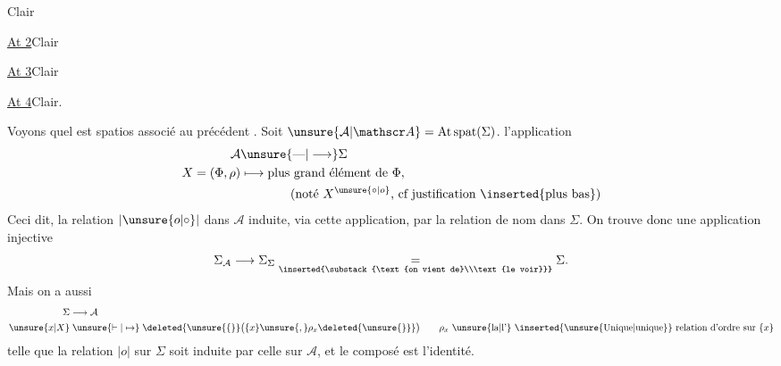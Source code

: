 \quad Clair

\uline{At 2}\quad Clair 

\uline{At 3}\quad Clair

\uline{At 4}\quad Clair.

 Voyons quel est    spatios associé au précédent .  Soit $\unsure{\mathcal A|\mathscr A}=\mathrm{At}\,\mathrm{spat}(\Sigma)$.  \deleted{$(\unsure{\Phi|\varPhi},\rho)$} l'application
\[
\begin{aligned}
\mathcal A&\unsure{\text{\textemdash}|\longrightarrow}\Sigma\\
X=(\Phi,\rho)&\longmapsto\text{plus grand élément de }\Phi,\\
&\hspace{4em}\text{(noté }X^{\unsure{\circ|o}}\text{, cf justification \inserted{plus bas})}
\end{aligned}
\]
Ceci dit, la relation $\mathrel{|\unsure{o|\circ}|}$ dans $\mathcal A$  induite, via cette application, par la relation de  nom dans $\Sigma$. On trouve donc une application injective
\[
\Sigma_{\mathcal A}\longrightarrow\Sigma_{\Sigma}
\underset{\inserted{\substack{\text{on vient de}\\\text{le voir}}}}{=}\Sigma.
\]
Mais on a aussi
\[
\begin{aligned}
\Sigma&\longrightarrow\mathcal A\\
\unsure{x|X}&\mathrel{\unsure{\vdash|\mapsto}}\deleted{\unsure{\{}}\bigl(\{x\}\unsure{,}\rho_x\deleted{\unsure{\}}}\bigr)
\qquad \rho_x\ \text{\unsure{la|l'} \inserted{\unsure{Unique|unique}} relation d'ordre sur }\{x\}
\end{aligned}
\]
telle que la relation $\mathrel{|o|}$ sur $\Sigma$ soit induite par celle sur $\mathcal A$, et le composé
est l'identité.
